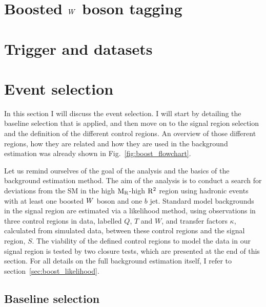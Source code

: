 \section[Boosted W boson tagging]{Boosted $W$ boson tagging \label{sec:boost_wtag}}




\section{Trigger and datasets \label{sec:trigger_datasets}}




\section{Event selection \label{sec:boost_event_selection}}

In this section I will discuss the event selection. I will start by detailing the baseline
selection that is applied, and then move on to the signal region selection and the definition of the
different control regions. 
An overview of those different regions, how they are related and how they are used in the
background estimation was already shown in Fig.~\ref{fig:boost_flowchart}. 

Let us remind ourselves of the goal of the analysis and the basics of the background estimation
method. 
The aim of the analysis is to conduct a search for deviations from the SM in the high $\mathrm{M_R}$-high
$\mathrm{R^2}$ region using hadronic events with at least one boosted $W$ boson and one $b$ jet.
Standard model backgrounds in the signal region are estimated via a likelihood method, using
observations in three control regions in data, labelled $Q$, $T$ and $W$, and transfer factors
$\kappa$, calculated from simulated data, between these control regions and the signal region,
$S$. 
The viability of the defined control regions to model the data in our signal region is tested by
two closure tests, which are presented at the end of this section.
For all details on the full background estimation itself, I refer to
section~\ref{sec:boost_likelihood}. 

\subsection{Baseline selection \label{sec:boost_baseline_selection}}

